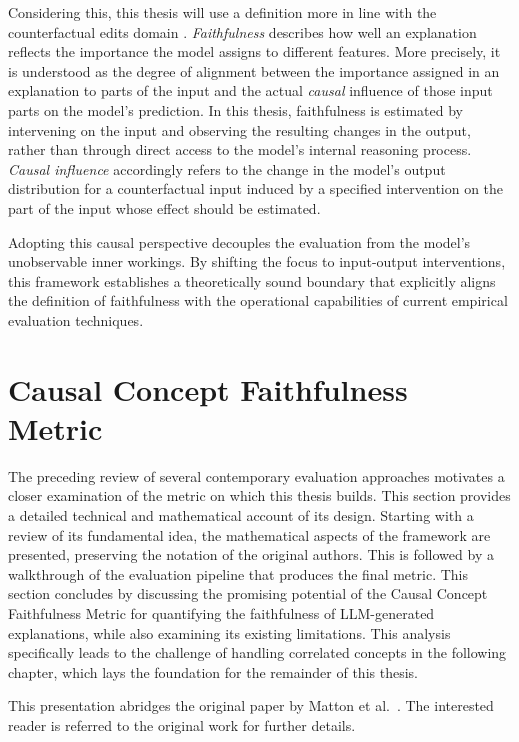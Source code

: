 Considering this, this thesis will use a definition more in line with the counterfactual edits domain \cite{atanasovaFaithfulnessTestsNatural2023, mattonWalkTalkMeasuring2024}. \emph{Faithfulness} describes how well an explanation reflects the importance the model assigns to different features. More precisely, it is understood as the degree of alignment between the importance assigned in an explanation to parts of the input and the actual \emph{causal} influence of those input parts on the model's prediction. In this thesis, faithfulness is estimated by intervening on the input and observing the resulting changes in the output, rather than through direct access to the model's internal reasoning process. \emph{Causal influence} \cite{pearlCausality2009} accordingly refers to the change in the model's output distribution for a counterfactual input induced by a specified intervention on the part of the input whose effect should be estimated.

Adopting this causal perspective decouples the evaluation from the model's unobservable inner workings. By shifting the focus to input-output interventions, this framework establishes a theoretically sound boundary that explicitly aligns the definition of faithfulness with the operational capabilities of current empirical evaluation techniques.

\section{Causal Concept Faithfulness Metric}
\label{sec:causal_concept_metric}
The preceding review of several contemporary evaluation approaches motivates a closer examination of the metric on which this thesis builds. This section provides a detailed technical and mathematical account of its design. Starting with a review of its fundamental idea, the mathematical aspects of the framework are presented, preserving the notation of the original authors. This is followed by a walkthrough of the evaluation pipeline that produces the final metric. This section concludes by discussing the promising potential of the Causal Concept Faithfulness Metric for quantifying the faithfulness of LLM-generated explanations, while also examining its existing limitations. This analysis specifically leads to the challenge of handling correlated concepts in the following chapter, which lays the foundation for the remainder of this thesis.

This presentation abridges the original paper by Matton et al.~\cite{mattonWalkTalkMeasuring2024}. The interested reader is referred to the original work for further details.

